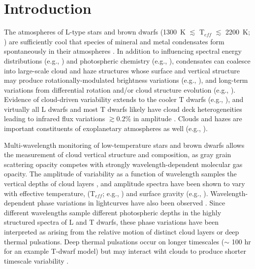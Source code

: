 \documentclass[twocolumn]{aastex6}
\newcommand{\teff}{T$_{eff}$}
\begin{document}



\section{Introduction}

The atmospheres of L-type stars and brown dwarfs (1300~K $\lesssim$ {\teff} $\lesssim$ 2200~K; \citealt{2015ApJ...810..158F}) are sufficiently cool that species of mineral and metal condensates form spontaneously in their atmospheres \citep{1996A&A...305L...1T,2010ApJ...716.1060V}.
In addition to influencing spectral energy distributions (e.g., \citealt{2001ApJ...556..357A,2008ApJ...674..451B}) and photospheric chemistry (e.g., \citealt{2000ApJ...531..438B}), condensates can coalesce into large-scale cloud and haze structures \citep{1989ApJ...338..314L,2001ApJ...556..872A,2014Natur.505..654C}
whose surface and vertical structure may produce rotationally-modulated brightness variations (e.g., \citealt{2012ApJ...750..105R}), and long-term variations from differential rotation and/or cloud structure evolution (e.g., \citealt{2009ApJ...701.1534A,2013A&A...555L...5G,2016ApJ...826....8Y}). Evidence of cloud-driven variability extends to the cooler T dwarfs (e.g., \citealt{2009ApJ...701.1534A,2012ApJ...760L..31B,2015ApJ...799..154M}), and virtually all L dwarfs and most T dwarfs likely have cloud deck heterogeneities leading to infrared flux variations $\gtrsim$0.2\% in amplitude \citep{2015ApJ...799..154M}. Clouds and hazes are important constituents of exoplanetary atmospheres as well (e.g., \citealt{2011ApJ...733...65B,2014Natur.505...69K,2016Natur.529...59S}).

Multi-wavelength monitoring of low-temperature stars and brown dwarfs allows the measurement of cloud vertical structure and composition, as gray grain scattering opacity competes with strongly wavelength-dependent molecular gas opacity. The amplitude of variability as a function of wavelength samples the vertical depths of cloud layers \citep{2013ApJ...768..121A}, and amplitude spectra have been shown to vary with effective temperature, ({\teff}; e.g., \citealt{2015ApJ...798L..13Y}) and surface gravity (e.g., \citealt{2016ApJ...829L..32L}).
Wavelength-dependent phase variations in lightcurves have also been observed \citep{2012ApJ...760L..31B,2013ApJ...778L..10B,2016ApJ...826....8Y}.
Since different wavelengths sample different photospheric depths in the highly structured spectra of L and T dwarfs, these phase variations have been interpreted as arising from the relative motion of distinct cloud layers or deep thermal pulsations. Deep thermal pulsations occur on longer timescales ($\sim$ 100 hr for an example T-dwarf model) but may interact wiht clouds to produce shorter timescale variability \citep{2014ApJ...785..158R}.
\end{document}
